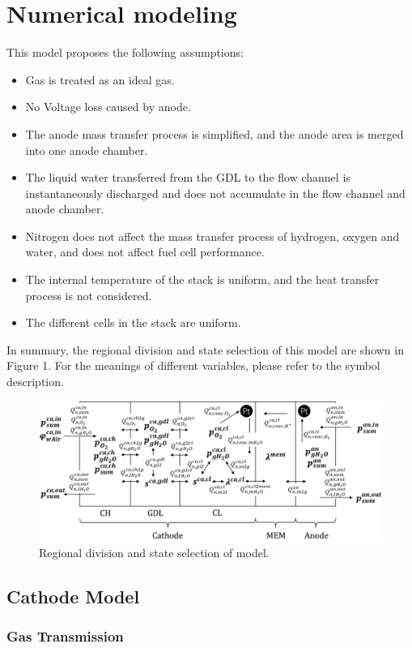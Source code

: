 \section{Numerical modeling}
This model proposes the following assumptions:
\begin{itemize}
    \item Gas is treated as an ideal gas.
    \item No Voltage loss caused by anode.
    \item The anode mass transfer process is simplified, and the anode area is merged into one anode chamber.
    \item The liquid water transferred from the GDL to the flow channel is instantaneously discharged and does not accumulate in the flow channel and anode chamber.
    \item Nitrogen does not affect the mass transfer process of hydrogen, oxygen and water, and does not affect fuel cell performance.
    \item The internal temperature of the stack is uniform, and the heat transfer process is not considered.
    \item The different cells in the stack are uniform.
\end{itemize}
In summary, the regional division and state selection of this model are shown in Figure 1. For the meanings of different variables, please refer to the symbol description.
\begin{figure}[h]
    \centering
    \includegraphics{Sensor_Fusion_pictures/figure1.jpg}
    \caption{Regional division and state selection of model.}
\end{figure}
\subsection{Cathode Model}
\subsubsection{Gas Transmission}

